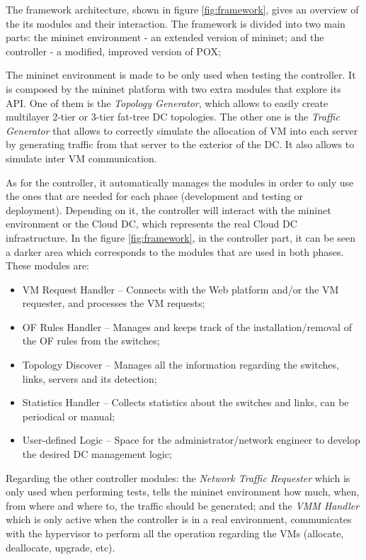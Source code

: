 \documentclass[12pt,english,oneside]{book}
\begin{document}
The framework architecture, shown in figure \ref{fig:framework}, gives an overview of the its modules and their interaction.
The framework is divided into two main parts: the mininet environment - an extended version of mininet; and the controller - a modified, improved version of POX;

The mininet environment is made to be only used when testing the controller.
It is composed by the mininet platform with two extra modules that explore its API.
One of them is the {\it Topology Generator}, which allows to easily create multilayer 2-tier or 3-tier fat-tree DC topologies.
The other one is the {\it Traffic Generator} that allows to correctly simulate the allocation of VM into each server by generating traffic from that server to the exterior of the DC. It also allows to simulate inter VM communication.

As for the controller, it automatically manages the modules in order to only use the ones that are needed for each phase (development and testing or deployment).
Depending on it, the controller will interact with the mininet environment or the Cloud DC, which represents the real Cloud DC infrastructure.
In the figure \ref{fig:framework}, in the controller part, it can be seen a darker area which corresponds to the modules that are used in both phases. These modules are:
\begin{itemize}
  \item VM Request Handler -- Connects with the Web platform and/or the VM requester, and processes the VM requests;
  \item OF Rules Handler -- Manages and keeps track of the installation/removal of the OF rules from the switches;
  \item Topology Discover -- Manages all the information regarding the switches, links, servers and its detection;
  \item Statistics Handler -- Collects statistics about the switches and links, can be periodical or manual;
  \item User-defined Logic -- Space for the administrator/network engineer to develop the desired DC management logic;
\end{itemize}

Regarding the other controller modules: the {\it Network Traffic Requester} which is only used when performing tests, tells the mininet environment how much, when, from where and where to, the traffic should be generated; and the {\it VMM Handler} which is only active when the controller is in a real environment, communicates with the hypervisor to perform all the operation regarding the VMs (allocate, deallocate, upgrade, etc).
\end{document}

